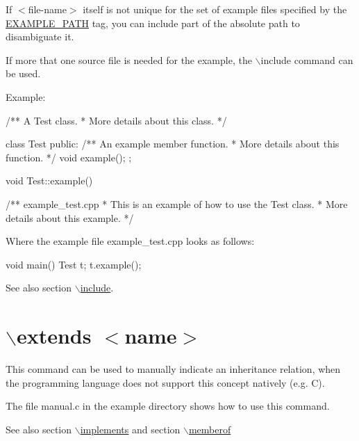If $<$file-\/name$>$ itself is not unique for the set of example files specified by the \hyperlink{config_cfg_example_path}{EXAMPLE\_\-PATH} tag, you can include part of the absolute path to disambiguate it.

If more that one source file is needed for the example, the $\backslash$include command can be used.

\begin{DoxyParagraph}{Example:}

\begin{DoxyVerbInclude}
/** A Test class.
 *  More details about this class.
 */

class Test
{
  public:
    /** An example member function.
     *  More details about this function.
     */
    void example();
};

void Test::example() {}

/** \example example_test.cpp
 * This is an example of how to use the Test class.
 * More details about this example.
 */
\end{DoxyVerbInclude}
 Where the example file {\ttfamily example\_\-test.cpp} looks as follows: 
\begin{DoxyVerbInclude}
void main()
{
  Test t;
  t.example();
}
\end{DoxyVerbInclude}
 
\end{DoxyParagraph}
\begin{DoxySeeAlso}{See also}
section \hyperlink{commands_cmdinclude}{$\backslash$include}.
\end{DoxySeeAlso}


 \hypertarget{commands_cmdextends}{}\section{$\backslash$extends $<$name$>$}\label{commands_cmdextends}
 This command can be used to manually indicate an inheritance relation, when the programming language does not support this concept natively (e.g. C).

The file {\ttfamily manual.c} in the example directory shows how to use this command.



\begin{DoxySeeAlso}{See also}
section \hyperlink{commands_cmdimplements}{$\backslash$implements} and section \hyperlink{commands_cmdmemberof}{$\backslash$memberof}
\end{DoxySeeAlso}



